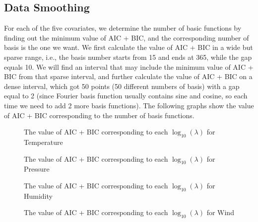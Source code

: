 \subsection{Data Smoothing}
For each of the five covariates, we determine the number of basic functions by finding out the minimum value of AIC + BIC, and the corresponding number of basis is the one we want. We first calculate the value of AIC + BIC in a wide but sparse range, i.e., the basis number starts from 15 and ends at 365, while the gap equals 10. We will find an interval that may include the minimum value of AIC + BIC from that sparse interval, and further calculate the value of AIC + BIC on a dense interval, which got 50 points (50 different numbers of basis) with a gap equal to 2 (since Fourier basis function usually contains sine and cosine, so each time we need to add 2 more basis functions). The following graphs show the value of AIC + BIC corresponding to the number of basis functions.

\begin{figure}[H]
\centering  %
\caption{The value of AIC + BIC corresponding to each $\log_{10}(\lambda)$ for Temperature}
\end{figure}

\begin{figure}[H]
\centering  %
\caption{The value of AIC + BIC corresponding to each $\log_{10}(\lambda)$ for Pressure}
\end{figure}

\begin{figure}[H]
\centering  %
\caption{The value of AIC + BIC corresponding to each $\log_{10}(\lambda)$ for Humidity}
\end{figure}

\begin{figure}[H]
\centering  %
\caption{The value of AIC + BIC corresponding to each $\log_{10}(\lambda)$ for Wind}
\end{figure}

